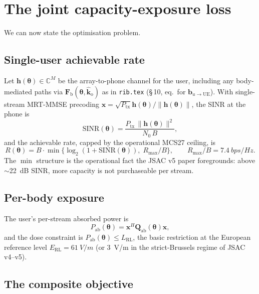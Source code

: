 \documentclass[11pt,a4paper]{article}
\theoremstyle{definition}
\newcommand{\Complex}{\mathbb{C}}
\newcommand{\Qabs}{\mathbf{Q}_{\mathrm{ab}}}
\newcommand{\kout}{\hat{\bm{k}}_{\mathrm{o}}}
\newcommand{\Frib}{\mathbf{F}_{\mathrm{b}}}
\newcommand{\hh}{\mathbf{h}}
\newcommand{\bvec}{\mathbf{b}}
\newcommand{\xvec}{\mathbf{x}}
\newcommand{\thetab}{\bm{\theta}}
\begin{document}
\section{The joint capacity-exposure loss}\label{sec:loss}

We can now state the optimisation problem.

\subsection{Single-user achievable rate}\label{sec:rate}

Let $\hh(\thetab)\in\Complex^M$ be the array-to-phone channel
for the user, including any body-mediated paths via
$\Frib(\thetab,\kout)$ as in \texttt{rib.tex} (\S\,10, eq.\ for
$\bvec_{u\to\mathrm{UE}}$).
With single-stream MRT-MMSE precoding $\xvec=\sqrt{P_{\mathrm{tx}}}
\hh(\thetab)/\|\hh(\thetab)\|$, the SINR at the phone is
\begin{equation}\label{eq:sinr}
  \mathrm{SINR}(\thetab)
  =\frac{P_{\mathrm{tx}}\,\|\hh(\thetab)\|^2}{N_0\,B},
\end{equation}
and the achievable rate, capped by the operational MCS27 ceiling, is
\begin{equation}\label{eq:rate-mcs}
  R(\thetab)=B\cdot\min\!\bigl\{\log_2(1+\mathrm{SINR}(\thetab)),\;
  R_{\max}/B\bigr\},
  \qquad R_{\max}/B = \SI{7.4}{bps/Hz}.
\end{equation}
The $\min$ structure is the operational fact the JSAC v5 paper
foregrounds: above $\sim$\SI{22}{dB} SINR, more capacity is not
purchaseable per stream.

\subsection{Per-body exposure}

The user's per-stream absorbed power is
\begin{equation}\label{eq:Pabs-1}
  P_{\mathrm{ab}}(\thetab)=\xvec^H\Qabs(\thetab)\xvec,
\end{equation}
and the dose constraint is $P_{\mathrm{ab}}(\thetab)\le L_{\mathrm{RL}}$,
the basic restriction at the European reference level
$E_{\mathrm{RL}}=\SI{61}{V/m}$ (or \SI{3}{V/m} in the strict-Brussels
regime of JSAC v4--v5).

\subsection{The composite objective}
\end{document}
